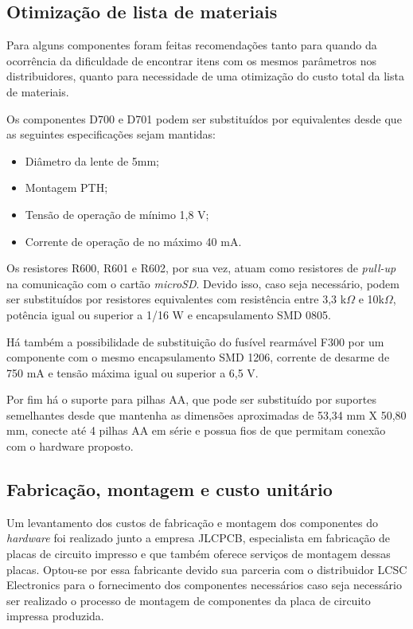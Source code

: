 \subsection{Otimização de lista de materiais}

Para alguns componentes foram feitas recomendações tanto para quando da ocorrência da dificuldade de encontrar itens com os mesmos parâmetros nos distribuidores, quanto para necessidade de uma otimização do custo total da lista de materiais.

Os componentes D700 e D701 podem ser substituídos por equivalentes desde que as seguintes especificações sejam mantidas:
    \begin{itemize}
        \item Diâmetro da lente de 5mm;
        \item Montagem PTH;
        \item Tensão de operação de mínimo 1,8 V;
        \item Corrente de operação de no máximo 40 mA.
    \end{itemize}
    
  Os resistores R600, R601 e R602, por sua vez, atuam como resistores de \textit{pull-up} na comunicação com o cartão \textit{microSD}. Devido isso, caso seja necessário, podem ser substituídos por resistores equivalentes com resistência entre 3,3 k$\Omega$ e 10k$\Omega$, potência igual ou superior a 1/16 W e encapsulamento SMD 0805.
    
 Há também a possibilidade de substituição do fusível rearmável F300 por um componente com o mesmo encapsulamento SMD 1206, corrente de desarme de 750 mA e tensão máxima igual ou superior a 6,5 V.
    
Por fim há o suporte para pilhas AA, que pode ser substituído por suportes semelhantes desde que mantenha as dimensões aproximadas de 53,34 mm X 50,80 mm, conecte até 4 pilhas AA em série e possua fios de que permitam conexão com o hardware proposto.

\subsection{Fabricação, montagem e custo unitário}

Um levantamento dos custos de fabricação e montagem dos componentes do \textit{hardware} foi realizado junto a empresa JLCPCB, especialista em fabricação de placas de circuito impresso e que também oferece serviços de montagem dessas placas. Optou-se por essa fabricante devido sua parceria com o distribuidor LCSC Electronics para o fornecimento dos componentes necessários caso seja necessário ser realizado o processo de montagem de componentes da placa de circuito impressa produzida.

